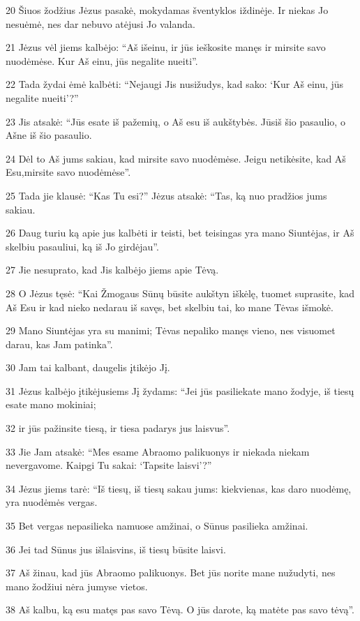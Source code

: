 \par 20 Šiuos žodžius Jėzus pasakė, mokydamas šventyklos iždinėje. Ir niekas Jo nesuėmė, nes dar nebuvo atėjusi Jo valanda. 
\par 21 Jėzus vėl jiems kalbėjo: “Aš išeinu, ir jūs ieškosite manęs ir mirsite savo nuodėmėse. Kur Aš einu, jūs negalite nueiti”. 
\par 22 Tada žydai ėmė kalbėti: “Nejaugi Jis nusižudys, kad sako: ‘Kur Aš einu, jūs negalite nueiti’?” 
\par 23 Jis atsakė: “Jūs esate iš pažemių, o Aš esu iš aukštybės. Jūs­iš šio pasaulio, o Aš­ne iš šio pasaulio. 
\par 24 Dėl to Aš jums sakiau, kad mirsite savo nuodėmėse. Jeigu netikėsite, kad Aš Esu,­mirsite savo nuodėmėse”. 
\par 25 Tada jie klausė: “Kas Tu esi?” Jėzus atsakė: “Tas, ką nuo pradžios jums sakiau. 
\par 26 Daug turiu ką apie jus kalbėti ir teisti, bet teisingas yra mano Siuntėjas, ir Aš skelbiu pasauliui, ką iš Jo girdėjau”. 
\par 27 Jie nesuprato, kad Jis kalbėjo jiems apie Tėvą. 
\par 28 O Jėzus tęsė: “Kai Žmogaus Sūnų būsite aukštyn iškėlę, tuomet suprasite, kad Aš Esu ir kad nieko nedarau iš savęs, bet skelbiu tai, ko mane Tėvas išmokė. 
\par 29 Mano Siuntėjas yra su manimi; Tėvas nepaliko manęs vieno, nes visuomet darau, kas Jam patinka”. 
\par 30 Jam tai kalbant, daugelis įtikėjo Jį. 
\par 31 Jėzus kalbėjo įtikėjusiems Jį žydams: “Jei jūs pasiliekate mano žodyje, iš tiesų esate mano mokiniai; 
\par 32 ir jūs pažinsite tiesą, ir tiesa padarys jus laisvus”. 
\par 33 Jie Jam atsakė: “Mes esame Abraomo palikuonys ir niekada niekam nevergavome. Kaipgi Tu sakai: ‘Tapsite laisvi’?” 
\par 34 Jėzus jiems tarė: “Iš tiesų, iš tiesų sakau jums: kiekvienas, kas daro nuodėmę, yra nuodėmės vergas. 
\par 35 Bet vergas nepasilieka namuose amžinai, o Sūnus pasilieka amžinai. 
\par 36 Jei tad Sūnus jus išlaisvins, iš tiesų būsite laisvi. 
\par 37 Aš žinau, kad jūs Abraomo palikuonys. Bet jūs norite mane nužudyti, nes mano žodžiui nėra jumyse vietos. 
\par 38 Aš kalbu, ką esu matęs pas savo Tėvą. O jūs darote, ką matėte pas savo tėvą”. 
